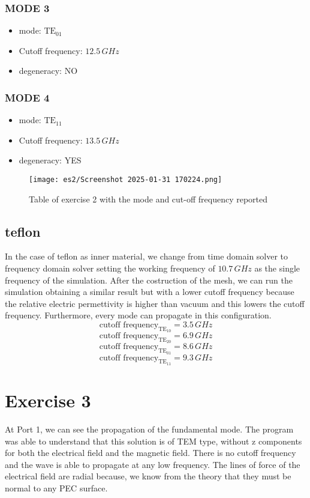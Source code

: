 \documentclass{article}
\begin{document}
\subsubsection{MODE 3}
\begin{itemize}
    \item mode: $\text{TE}_{01}$
    \item Cutoff frequency: $12.5 \, GHz$
    \item degeneracy: NO
\end{itemize}

\subsubsection{MODE 4}
\begin{itemize}
    \item mode: $\text{TE}_{11}$
    \item Cutoff frequency: $13.5 \, GHz$
    \item degeneracy: YES
\end{itemize}

\begin{figure}[h]
\centering
\texttt{[image: es2/Screenshot 2025-01-31 170224.png]}
\caption{Table of exercise 2 with the mode and cut-off frequency reported}
\label{fig:tablees2}
\end{figure}

\subsection{teflon}
In the case of teflon as inner material, we change from time domain solver to frequency domain solver setting the working frequency of $10.7\,GHz$ as the single frequency of the simulation. After the costruction of the mesh, we can run the simulation obtaining a similar result but with a lower cutoff frequency because the relative electric permettivity is higher than vacuum and this lowers the cutoff frequency. Furthermore, every mode can propagate in this configuration.
$$\text{cutoff frequency}_{\text{TE}_{10}} = 3.5\,GHz$$
$$\text{cutoff frequency}_{\text{TE}_{20}} = 6.9\,GHz$$
$$\text{cutoff frequency}_{\text{TE}_{01}} = 8.6\,GHz$$
$$\text{cutoff frequency}_{\text{TE}_{11}} = 9.3\,GHz$$






\section{Exercise 3}
At Port 1, we can see the propagation of the fundamental mode. The program was able to understand that this solution is of TEM type, without z components for both the electrical field and the magnetic field. There is no cutoff frequency and the wave is able to propagate at any low frequency. The lines of force of the electrical field are radial because, we know from the theory that they must be normal to any PEC surface.
\end{document}
